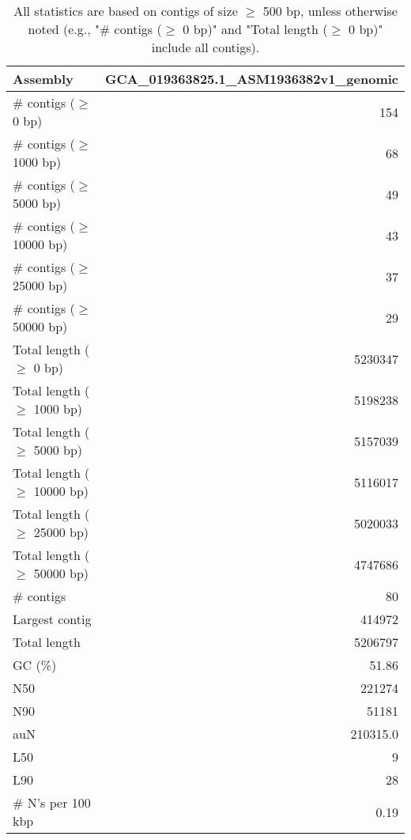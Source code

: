 \documentclass[12pt,a4paper]{article}
\begin{document}
\begin{table}[ht]
\begin{center}
\caption{All statistics are based on contigs of size $\geq$ 500 bp, unless otherwise noted (e.g., "\# contigs ($\geq$ 0 bp)" and "Total length ($\geq$ 0 bp)" include all contigs).}
\begin{tabular}{|l*{1}{|r}|}
\hline
Assembly & GCA\_019363825.1\_ASM1936382v1\_genomic \\ \hline
\# contigs ($\geq$ 0 bp) & 154 \\ \hline
\# contigs ($\geq$ 1000 bp) & 68 \\ \hline
\# contigs ($\geq$ 5000 bp) & 49 \\ \hline
\# contigs ($\geq$ 10000 bp) & 43 \\ \hline
\# contigs ($\geq$ 25000 bp) & 37 \\ \hline
\# contigs ($\geq$ 50000 bp) & 29 \\ \hline
Total length ($\geq$ 0 bp) & 5230347 \\ \hline
Total length ($\geq$ 1000 bp) & 5198238 \\ \hline
Total length ($\geq$ 5000 bp) & 5157039 \\ \hline
Total length ($\geq$ 10000 bp) & 5116017 \\ \hline
Total length ($\geq$ 25000 bp) & 5020033 \\ \hline
Total length ($\geq$ 50000 bp) & 4747686 \\ \hline
\# contigs & 80 \\ \hline
Largest contig & 414972 \\ \hline
Total length & 5206797 \\ \hline
GC (\%) & 51.86 \\ \hline
N50 & 221274 \\ \hline
N90 & 51181 \\ \hline
auN & 210315.0 \\ \hline
L50 & 9 \\ \hline
L90 & 28 \\ \hline
\# N's per 100 kbp & 0.19 \\ \hline
\end{tabular}
\end{center}
\end{table}
\end{document}
